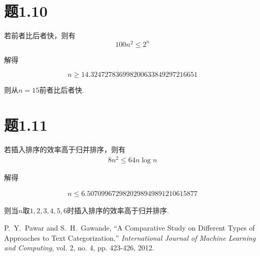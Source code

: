 \documentclass[a4paper,twoside]{article}
\begin{document}
\begin{spacing}{1.2}
\section{题1.10}

若前者比后者快，则有
$$
100n^2 \le 2^n
$$

解得

$$
n \ge 14.324727836998200633849297216651
$$

则从$n=15$前者比后者快.

\section{题1.11}
若插入排序的效率高于归并排序，则有
\begin{align*}
	8n^2 \le 64n \log n
\end{align*}

解得

\begin{align*}
	n \le 6.5070996729820298949891210615877
\end{align*}

则当$n$取$1,2,3,4,5,6$时插入排序的效率高于归并排序.

\newpage
\begin{thebibliography}{00}
	
	
	P.~Y.~Pawar and S.~H.~Gawande, ``A Comparative Study on Different Types of Approaches to Text Categorization,'' \textit{International Journal of Machine Learning and Computing}, vol. 2, no. 4, pp. 423-426, 2012.

	
\end{thebibliography}


\addtocounter{page}{-1}
\thispagestyle{empty}

\end{spacing}
\end{document}
